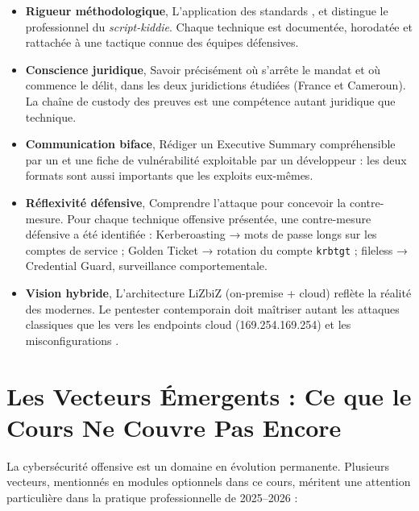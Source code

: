 \begin{itemize}
    \item \textbf{Rigueur méthodologique}, L'application des standards ,
           et  distingue le
          professionnel du \textit{script-kiddie}. Chaque technique est
          documentée, horodatée et rattachée à une tactique connue des
          équipes défensives.

    \item \textbf{Conscience juridique}, Savoir précisément où s'arrête
          le mandat et où commence le délit, dans les deux juridictions
          étudiées (France et Cameroun). La chaîne de custody des preuves
          est une compétence autant juridique que technique.

    \item \textbf{Communication biface}, Rédiger un Executive Summary
          compréhensible par un  et une fiche de vulnérabilité
          exploitable par un développeur : les deux formats sont aussi
          importants que les exploits eux-mêmes.

    \item \textbf{Réflexivité défensive}, Comprendre l'attaque pour
          concevoir la contre-mesure. Pour chaque technique offensive
          présentée, une contre-mesure défensive a été identifiée :
          Kerberoasting → mots de passe longs sur les comptes de service ;
          Golden Ticket → rotation du compte \texttt{krbtgt} ;
          fileless → Credential Guard, surveillance comportementale.

    \item \textbf{Vision hybride}, L'architecture LiZbiZ (on-premise +
          cloud) reflète la réalité des  modernes. Le pentester
          contemporain doit maîtriser autant les attaques 
          classiques que les  vers les endpoints 
          cloud (169.254.169.254) et les misconfigurations .
\end{itemize}

\section*{Les Vecteurs Émergents : Ce que le Cours Ne Couvre Pas Encore}

La cybersécurité offensive est un domaine en évolution permanente. Plusieurs
vecteurs, mentionnés en modules optionnels dans ce cours, méritent une
attention particulière dans la pratique professionnelle de 2025--2026 :


